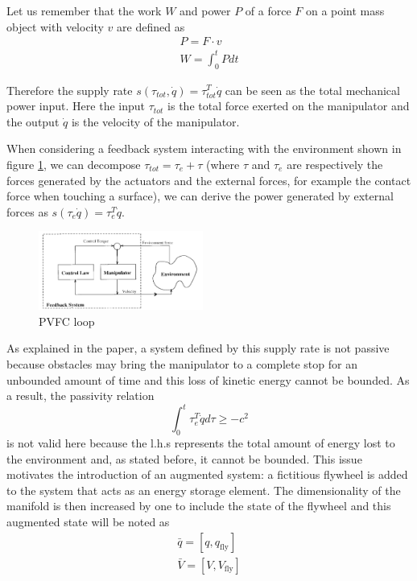 Let us remember that the work $W$ and power $P$ of a force $F$ on a point mass object with velocity $v$ are defined as
\begin{align}
    P = F\cdot v\\
    W = \int_{0}^{t}P dt
\end{align}

Therefore the supply rate  $s(\tau_{tot},\dot{q})=\tau_{tot}^{T}\dot{q}$ can be seen as the total mechanical power input. Here the input $\tau_{tot}$ is the total force exerted on the manipulator 
and the output $\dot{q}$ is the velocity of the manipulator. 

When considering a feedback system interacting with the environment shown in figure \ref{fig:pvfccontrolloop}, we can decompose $\tau_{tot}=\tau_{e}+\tau$ (where $\tau$ and $\tau_{e}$ are respectively the forces generated by the actuators and the external forces, for example the contact force when touching a surface),
we can derive the power generated by external forces as $s(\tau_{e}\dot{q})=\tau_{e}^T \dot{q}$. 
\begin{figure}[h!]
    \centering
    \includegraphics[width=0.48\textwidth]{Images/pvfccontrolloop.png}
    \caption{PVFC loop \cite{li1999passive}}
    \label{fig:pvfccontrolloop}
\end{figure} 
As explained in the paper, a system defined by this supply rate is not passive because obstacles may bring the manipulator to a complete stop for an unbounded amount of time and this loss of kinetic energy cannot be bounded. 
As a result, the passivity relation 
\begin{equation}
    \int_{0}^{t}\tau_{e}^T \dot{q}d\tau \geq -c^2 
\end{equation}
is not valid here because the l.h.s represents the total amount of energy lost to the environment and, as stated before, it cannot be bounded. 
This issue motivates the introduction of an augmented system: a fictitious flywheel is added to the system that acts as an energy storage element.
The dimensionality of the manifold is then increased by one to include the state of the flywheel and this augmented state will be noted as
\begin{align} 
    \bar{q}=[q,q_{\text{fly}}]\\
    \bar{V} = [V, V_{\text{fly}}]
\end{align}

